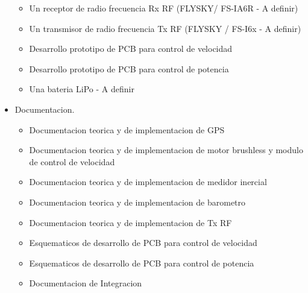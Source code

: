 \documentclass[
11pt, %
]{charter}
\begin{document}
\begin{itemize}
\begin{itemize}
			      \item Un receptor de radio frecuencia Rx RF (FLYSKY/ FS-IA6R - A definir) 
			      \item Un transmisor de radio frecuencia Tx RF (FLYSKY / FS-I6x - A definir)
				  \item	Desarrollo prototipo de PCB para control de velocidad
			      \item Desarrollo prototipo de PCB para control de potencia
			      \item Una bateria LiPo - A definir
		      \end{itemize}
		\item Documentacion.
		      \begin{itemize}
			      \item Documentacion teorica y de implementacion de GPS
			      \item Documentacion teorica y de implementacion de motor brushless y modulo de control de velocidad
			      \item Documentacion teorica y de implementacion de medidor inercial
			      \item Documentacion teorica y de implementacion de barometro
			      \item Documentacion teorica y de implementacion de Tx RF
			      \item Esquematicos de desarrollo de PCB para control de velocidad
			      \item Esquematicos de desarrollo de PCB para control de potencia
			      \item Documentacion de Integracion
		      \end{itemize}

	\end{itemize}
	
\end{document}
